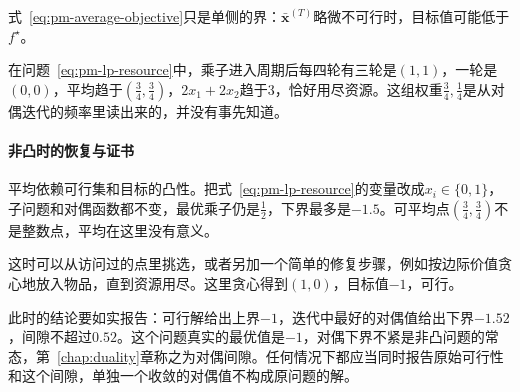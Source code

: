 式~\eqref{eq:pm-average-objective}只是单侧的界：$\bar{\bm{x}}^{(T)}$略微不可行时，目标值可能低于$f^\star$。

在问题~\eqref{eq:pm-lp-resource}中，乘子进入周期后每四轮有三轮是$(1,1)$，一轮是$(0,0)$，平均趋于$(\tfrac34,\tfrac34)$，$2x_1+2x_2$趋于$3$，恰好用尽资源。这组权重$\tfrac34,\tfrac14$是从对偶迭代的频率里读出来的，并没有事先知道。

\paragraph{非凸时的恢复与证书}
平均依赖可行集和目标的凸性。把式~\eqref{eq:pm-lp-resource}的变量改成$x_i\in\{0,1\}$，子问题和对偶函数都不变，最优乘子仍是$\tfrac12$，下界最多是$-1.5$。可平均点$(\tfrac34,\tfrac34)$不是整数点，平均在这里没有意义。

这时可以从访问过的点里挑选，或者另加一个简单的修复步骤，例如按边际价值贪心地放入物品，直到资源用尽。这里贪心得到$(1,0)$，目标值$-1$，可行。

此时的结论要如实报告：可行解给出上界$-1$，迭代中最好的对偶值给出下界$-1.52$，间隙不超过$0.52$。这个问题真实的最优值是$-1$，对偶下界不紧是非凸问题的常态，第~\ref{chap:duality}章称之为对偶间隙。任何情况下都应当同时报告原始可行性和这个间隙，单独一个收敛的对偶值不构成原问题的解。
